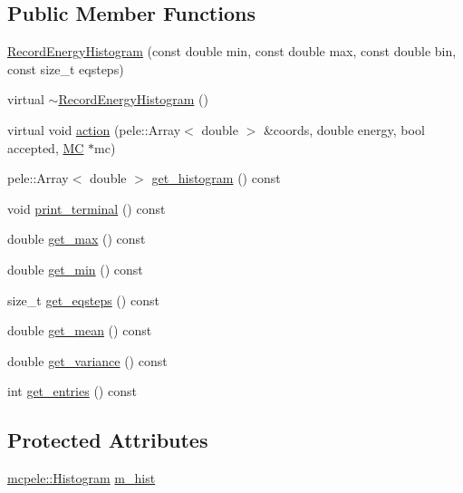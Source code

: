 \subsection*{\-Public \-Member \-Functions}
\begin{DoxyCompactItemize}
\item 
\hyperlink{classmcpele_1_1RecordEnergyHistogram_a33f921c473b0e72b1965466d00951907}{\-Record\-Energy\-Histogram} (const double min, const double max, const double bin, const size\-\_\-t eqsteps)
\item 
virtual \hyperlink{classmcpele_1_1RecordEnergyHistogram_a4635539552b05ae80b711141783591d2}{$\sim$\-Record\-Energy\-Histogram} ()
\item 
virtual void \hyperlink{classmcpele_1_1RecordEnergyHistogram_af0aa711e4556dff5ae5837e42be17ecc}{action} (pele\-::\-Array$<$ double $>$ \&coords, double energy, bool accepted, \hyperlink{classmcpele_1_1MC}{\-M\-C} $\ast$mc)
\item 
pele\-::\-Array$<$ double $>$ \hyperlink{classmcpele_1_1RecordEnergyHistogram_a9e4df47ed681ca5de613bab6021bf32c}{get\-\_\-histogram} () const 
\item 
void \hyperlink{classmcpele_1_1RecordEnergyHistogram_adb151dfde34fbf2ea0317ee263d76c6b}{print\-\_\-terminal} () const 
\item 
double \hyperlink{classmcpele_1_1RecordEnergyHistogram_aab9cbcb6bfe0e402c225cb2d24c89d07}{get\-\_\-max} () const 
\item 
double \hyperlink{classmcpele_1_1RecordEnergyHistogram_abff6ed2dcf35f522d157401488402e42}{get\-\_\-min} () const 
\item 
size\-\_\-t \hyperlink{classmcpele_1_1RecordEnergyHistogram_acfe168ed7f14c8844acdb558c7dd1552}{get\-\_\-eqsteps} () const 
\item 
double \hyperlink{classmcpele_1_1RecordEnergyHistogram_a978c1bb832d0904664d108102e90abe2}{get\-\_\-mean} () const 
\item 
double \hyperlink{classmcpele_1_1RecordEnergyHistogram_a7246334bfba14e88b80cd4483b3e3eec}{get\-\_\-variance} () const 
\item 
int \hyperlink{classmcpele_1_1RecordEnergyHistogram_a551a641f1e019ba960d2feecd2ddabf0}{get\-\_\-entries} () const 
\end{DoxyCompactItemize}
\subsection*{\-Protected \-Attributes}
\begin{DoxyCompactItemize}
\item 
\hyperlink{classmcpele_1_1Histogram}{mcpele\-::\-Histogram} \hyperlink{classmcpele_1_1RecordEnergyHistogram_a5c6bc30e23e724736b75e7ed61b55ca1}{m\-\_\-hist}
\end{DoxyCompactItemize}


